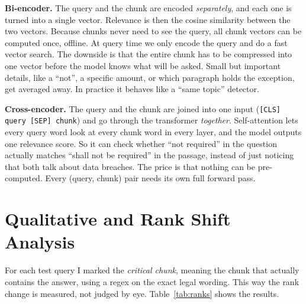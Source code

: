 \documentclass[11pt]{article}
\begin{document}
\textbf{Bi-encoder.} The query and the chunk are encoded \emph{separately}, and each one is turned into a single
vector. Relevance is then the cosine similarity between the two vectors. Because chunks never need to see the
query, all chunk vectors can be computed once, offline. At query time we only encode the query and do a fast vector
search. The downside is that the entire chunk has to be compressed into one vector before the model knows what
will be asked. Small but important details, like a ``not'', a specific amount, or which paragraph holds the
exception, get averaged away. In practice it behaves like a ``same topic'' detector.

\textbf{Cross-encoder.} The query and the chunk are joined into one input (\texttt{[CLS] query [SEP] chunk}) and go
through the transformer \emph{together}. Self-attention lets every query word look at every chunk word in every layer,
and the model outputs one relevance score. So it can check whether ``not required'' in the question actually matches
``shall not be required'' in the passage, instead of just noticing that both talk about data breaches. The price is
that nothing can be pre-computed. Every (query, chunk) pair needs its own full forward pass.

\section{Qualitative and Rank Shift Analysis}

For each test query I marked the \emph{critical chunk}, meaning the chunk that actually contains the answer,
using a regex on the exact legal wording. This way the rank change is measured, not judged by eye.
Table~\ref{tab:ranks} shows the results.
\end{document}
